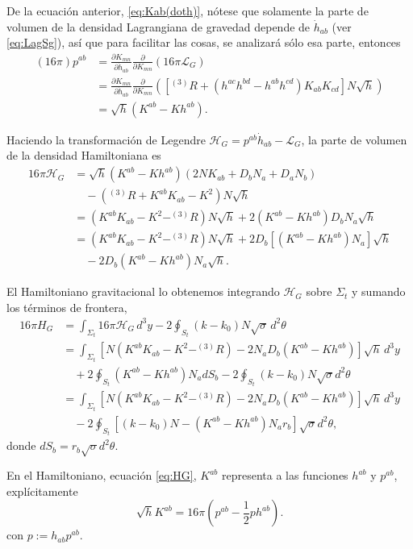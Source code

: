 De la ecuaci\'{o}n anterior, \eqref{eq:Kab(doth)}, n\'{o}tese que solamente la parte de volumen de la densidad Lagrangiana de gravedad depende de $\dot{h}_{ab}$ (ver \eqref{eq:LagSg}), as\'{i} que para facilitar las cosas, se analizar\'{a} s\'{o}lo esa parte, entonces
%
\begin{align}
\label{eq:pabADM}
(16 \pi) p^{ab} & = \frac{\partial K_{mn}}{\partial \dot{h}_{ab}} \frac{\partial}{\partial K_{mn}} \left( 16 \pi \mathcal{L}_{G} \right) \nonumber \\
& = \frac{\partial K_{mn}}{\partial \dot{h}_{ab}} \frac{\partial}{\partial K_{mn}} \left( [^{(3)}R + (h^{ac} h^{bd} - h^{ab} h^{cd}) K_{ab} K_{cd}] N \sqrt{h} \right) \nonumber \\
& = \sqrt{h} (K^{ab} - K h^{ab}).
\end{align}

Haciendo la transformaci\'{o}n de Legendre $\mathcal{H}_{G} = p^{ab} \dot{h}_{ab} - \mathcal{L}_{G}$, la parte de volumen de la densidad Hamiltoniana es
%
\begin{align}
16 \pi \mathcal{H}_{G} & = \sqrt{h} (K^{ab} - K h^{ab}) (2 N K_{ab} + D_{b} N_{a} + D_{a} N_{b}) \nonumber \\
& \quad - (^{(3)}R + K^{ab} K_{ab} - K^{2}) N \sqrt{h} \nonumber \\
& = (K^{ab} K_{ab} - K^{2} - ^{(3)}R) N \sqrt{h} + 2 (K^{ab} - K h^{ab}) D_{b} N_{a} \sqrt{h} \nonumber \\
& = (K^{ab} K_{ab} - K^{2} - ^{(3)}R) N \sqrt{h} + 2 D_{b} [(K^{ab} - K h^{ab}) N_{a}] \sqrt{h} \nonumber \\
& \quad - 2 D_{b} (K^{ab} - K h^{ab}) N_{a} \sqrt{h}.
\end{align}

El Hamiltoniano gravitacional lo obtenemos integrando $\mathcal{H}_{G}$ sobre $\Sigma_{t}$ y sumando los t\'{e}rminos de frontera,
%
\begin{align}
\label{eq:HG}
16 \pi H_{G} & = \int_{\Sigma_{t}} 16 \pi \mathcal{H}_{G} \, d^{3} y - 2 \oint_{S_{t}} (k - k_{0}) N \sqrt{\sigma} \, d^{2} \theta \nonumber \\
& = \int_{\Sigma_{t}} \left[ N (K^{ab} K_{ab} - K^{2} - ^{(3)}R) - 2 N_{a} D_{b} (K^{ab} - K h^{ab}) \right] \sqrt{h} \, d^{3} y \nonumber \\
& \quad + 2 \oint_{S_{t}} (K^{ab} - K h^{ab}) N_{a} d S_{b} - 2 \oint_{S_{t}} (k - k_{0}) N \sqrt{\sigma} d^{2} \theta \nonumber \\
& = \int_{\Sigma_{t}} \left[ N (K^{ab} K_{ab} - K^{2} - ^{(3)}R) - 2 N_{a} D_{b} (K^{ab} - K h^{ab}) \right] \sqrt{h} \, d^{3} y \nonumber \\
& \quad - 2 \oint_{S_{t}} \left[ (k - k_{0}) N - (K^{ab} - K h^{ab}) N_{a} r_{b} \right] \sqrt{\sigma} d^{2} \theta,
\end{align}
%
donde $d S_{b} = r_{b} \sqrt{\sigma} d^{2} \theta$.

En el Hamiltoniano, ecuaci\'{o}n \eqref{eq:HG}, $K^{ab}$ representa a las funciones $h^{ab}$ y $p^{ab}$, expl\'{i}citamente
%
\begin{equation}
\label{eq:Kph}
\sqrt{h} K^{ab} = 16 \pi ( p^{ab} - \frac{1}{2} p h^{ab}).
\end{equation}
%
con $p:= h_{ab} p^{ab}$.